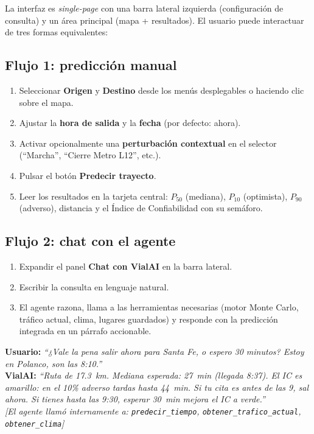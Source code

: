 \documentclass[11pt,a4paper]{article}
\begin{document}
La interfaz es \emph{single-page} con una barra lateral izquierda
(configuración de consulta) y un área principal (mapa + resultados).
El usuario puede interactuar de tres formas equivalentes:

\subsection{Flujo 1: predicción manual}

\begin{enumerate}
\item Seleccionar \textbf{Origen} y \textbf{Destino} desde los menús
desplegables o haciendo clic sobre el mapa.
\item Ajustar la \textbf{hora de salida} y la \textbf{fecha} (por
defecto: ahora).
\item Activar opcionalmente una \textbf{perturbación contextual} en
el selector (``Marcha'', ``Cierre Metro L12'', etc.).
\item Pulsar el botón \textcolor{vialTeal}{\textbf{Predecir trayecto}}.
\item Leer los resultados en la tarjeta central:
$P_{50}$ (mediana), $P_{10}$ (optimista), $P_{90}$ (adverso),
distancia y el Índice de Confiabilidad con su semáforo.
\end{enumerate}

\subsection{Flujo 2: chat con el agente}

\begin{enumerate}
\item Expandir el panel \textbf{Chat con VialAI} en la barra lateral.
\item Escribir la consulta en lenguaje natural.
\item El agente razona, llama a las herramientas necesarias (motor
Monte Carlo, tráfico actual, clima, lugares guardados) y responde
con la predicción integrada en un párrafo accionable.
\end{enumerate}

\begin{casebox}
\textbf{Usuario:} \textit{``¿Vale la pena salir ahora para Santa Fe,
o espero 30 minutos? Estoy en Polanco, son las 8:10.''} \\[0.3em]
\textbf{VialAI:} \textit{``Ruta de 17.3~km. Mediana esperada: 27~min
(llegada 8:37). El IC es amarillo: en el 10\% adverso tardas hasta
44~min. Si tu cita es antes de las 9, sal ahora. Si tienes hasta las
9:30, esperar 30~min mejora el IC a verde.''} \\[0.2em]
\textit{[El agente llamó internamente a: \texttt{predecir\_tiempo},
\texttt{obtener\_trafico\_actual}, \texttt{obtener\_clima}]}
\end{casebox}
\end{document}
